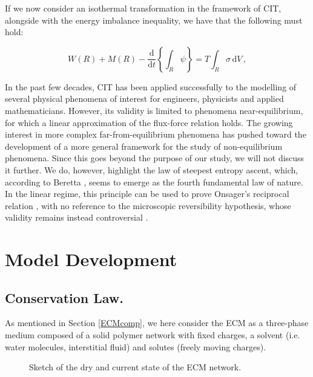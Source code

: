 \documentclass[runningheads]{llncs}
\renewcommand{\d}{\ensuremath{\text{d}}}
\begin{document}
If we now consider an isothermal transformation in the framework of CIT, alongside with the energy imbalance inequality, we have that the following must hold:

\begin{equation}
W(R)+M(R)-\frac{\d}{\d t} \left\{\int_R \psi \right\} = T \int_R \sigma \,\d V\, ,
\label{eqCIT}
\end{equation}

In the past few decades, CIT has been applied successfully to the modelling of several physical phenomena of interest for engineers, physicists and applied mathematicians. However, its validity is limited to phenomena near-equilibrium, for which a linear approximation of the flux-force relation holds. The growing interest in more complex far-from-equilibrium phenomena has pushed toward the development of a more general framework for the study of non-equilibrium phenomena. Since this goes beyond the purpose of our study, we will not discuss it further. We do, however, highlight the law of steepest entropy ascent, which, according to Beretta \cite{SEA2}, seems to emerge as the fourth fundamental law of nature. In the linear regime, this principle can be used to prove Onsager's reciprocal relation \cite{SEA1}, with no reference to the microscopic reversibility hypothesis, whose validity remains instead controversial \cite{CIT}.

\section{Model Development}
\label{modeldev}
\subsection{Conservation Law.}
\label{conslaw}
As mentioned in Section \ref{ECMcomp}, we here consider the ECM as a three-phase medium composed of a solid polymer network with fixed charges, a solvent (i.e. water molecules, interstitial fluid) and solutes (freely moving charges). 
\begin{figure}[h!]
	\centering
	\def\svgwidth{0.9\linewidth}
	
	\caption{Sketch of the dry and current state of the ECM network.}
	\label{Above}
\end{figure}
\end{document}
